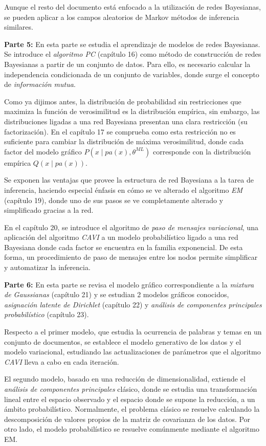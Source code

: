 Aunque el resto del documento está enfocado a la utilización de redes Bayesianas, se pueden aplicar a los campos aleatorios de Markov métodos de inferencia similares.

\textbf{Parte 5:} En esta parte se estudia el aprendizaje de modelos de redes Bayesianas. Se introduce el \emph{algoritmo PC} (capítulo 16) como método de construcción de redes Bayesianas a partir de un conjunto de datos. Para ello, es necesario calcular la independencia condicionada de un conjunto de variables, donde surge el concepto de \emph{información mutua}.

Como ya dijimos antes, la distribución de probabilidad sin restricciones que maximiza la función de verosimilitud es la distribución empírica, sin embargo, las distribuciones ligadas a una red Bayesiana presentan una clara restricción (su factorización). En el capítulo 17 se comprueba como esta restricción no es suficiente para cambiar la distribución de máxima verosimilitud, donde cada factor del modelo gráfico \(P(x \mid pa(x), \theta^{ML})\)  corresponde con la distribución empírica \(Q(x \mid pa(x))\).

Se exponen las ventajas que provee la estructura de red Bayesiana a la tarea de inferencia, haciendo especial énfasis en cómo se ve alterado el algoritmo \emph{EM} (capítulo 19), donde uno de sus pasos se ve completamente alterado y simplificado gracias a la red.

En el capítulo 20, se introduce el algoritmo de \emph{paso de mensajes variacional}, una aplicación del algoritmo \emph{CAVI} a un modelo probabilístico ligado a una red Bayesiana donde cada factor se encuentra en la familia exponencial. De esta forma, un procedimiento de paso de mensajes entre los nodos permite simplificar y automatizar la inferencia.

\textbf{Parte 6:} En esta parte se revisa el modelo gráfico correspondiente a la \emph{mixtura de Gaussianas} (capítulo 21) y se estudian 2 modelos gráficos conocidos, \emph{asignación latente de Dirichlet} (capítulo 22) y \emph{análisis de componentes principales probabilístico} (capítulo 23).

Respecto a el primer modelo, que estudia la ocurrencia de palabras y temas en un conjunto de documentos, se establece el modelo generativo de los datos y el modelo variacional, estudiando las actualizaciones de parámetros que el algoritmo \emph{CAVI} lleva a cabo en cada iteración.

El segundo modelo, basado en una reducción de dimensionalidad, extiende el \emph{análisis de componentes principales} clásico, donde se estudia una transformación lineal entre el espacio observado y el espacio donde se supone la reducción, a un ámbito probabilístico. Normalmente, el problema clásico se resuelve calculando la descomposición de valores propios de la matriz de covarianza de los datos. Por otro lado, el modelo probabilístico se resuelve comúnmente mediante el algoritmo EM.

